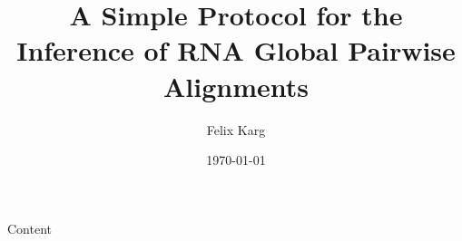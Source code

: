 \documentclass[12pt,compress,ngerman,utf8,t,usenames,dvipsnames]{beamer}
\date{\today}
\institute{University of Freiburg}
\title{A Simple Protocol for the Inference of RNA Global Pairwise Alignments}
\author{Felix Karg}
\begin{document}
\maketitle



\begin{frame}{Content}
    \large
        \tableofcontents[]
\end{frame}


%


% 
% 
% 

% 


\end{document}
